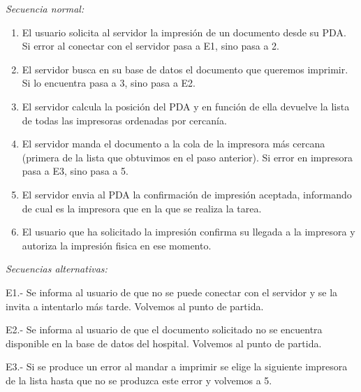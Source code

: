 \documentclass[12pt,a4paper,notitlepage,twoside]{report}
\begin{document}
\emph{Secuencia normal:} 
\begin{enumerate}
\item El usuario solicita al servidor la impresi\'on de un documento desde su PDA. Si error al conectar con el servidor pasa a E1, sino pasa a 2.
\item El servidor busca en su base de datos el documento que queremos imprimir. Si lo encuentra pasa a 3, sino pasa a E2.
\item El servidor calcula la posici\'on del PDA y en funci\'on de ella devuelve la lista de todas las impresoras ordenadas por cercan\'ia.
\item El servidor manda el documento a la cola de la impresora m\'as cercana (primera de la lista que obtuvimos en el paso anterior). Si error en impresora pasa a E3, sino pasa a 5.
\item El servidor envia al PDA la confirmaci\'on de impresi\'on aceptada, informando de cual es la impresora que en la que se realiza la tarea.
\item El usuario que ha solicitado la impresi\'on confirma su llegada a la impresora y autoriza la impresi\'on fisica en ese momento.
\end{enumerate}
\emph{Secuencias alternativas:}
\begin{description}
\item E1.- Se informa al usuario de que no se puede conectar con el servidor y se la invita a intentarlo m\'as tarde. Volvemos al punto de partida.
\item E2.- Se informa al usuario de que el documento solicitado no se encuentra disponible en la base de datos del hospital. Volvemos al punto de partida.
\item E3.- Si se produce un error al mandar a imprimir se elige la siguiente impresora de la lista hasta que no se produzca este error y volvemos a 5.
\end{description}
\end{document}
